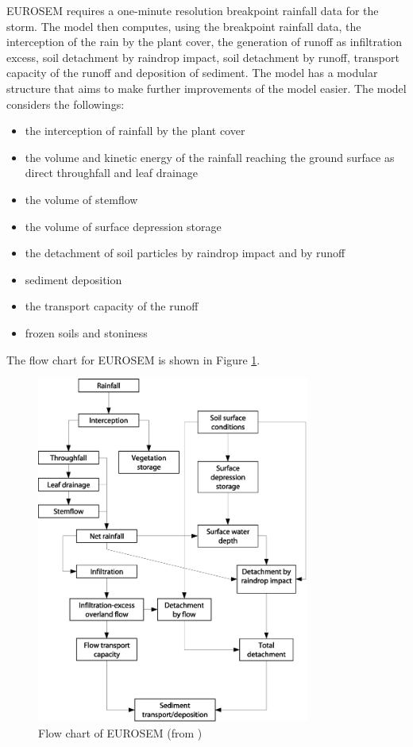 EUROSEM requires a one-minute resolution breakpoint rainfall data for the storm.
The model then computes, using the breakpoint rainfall data, the interception of
the rain by the plant cover, the generation of runoff as infiltration excess,
soil detachment by raindrop impact, soil detachment by runoff, transport
capacity of the runoff and deposition of sediment. The model has a modular
structure that aims to make further improvements of the model easier. The model
considers the followings:
\begin{itemize}
\item the interception of rainfall by the plant cover
\item the volume and kinetic energy of the rainfall reaching the ground surface
as direct throughfall and leaf drainage
\item the volume of stemflow
\item the volume of surface depression storage
\item the detachment of soil particles by raindrop impact and by runoff
\item sediment deposition
\item the transport capacity of the runoff
\item frozen soils and stoniness
\end{itemize}

The flow chart for EUROSEM is shown in Figure \ref{fig:eurosem_flow_chart}.

\begin{figure}[htbp]
  \centering
    \includegraphics[width=0.80\textwidth]{./img/eurosem_flow_chart}
  \caption[Flow chart of EUROSEM]{Flow chart of EUROSEM (from
\citealp{morgan1998-389})}
  \label{fig:eurosem_flow_chart}
\end{figure}

